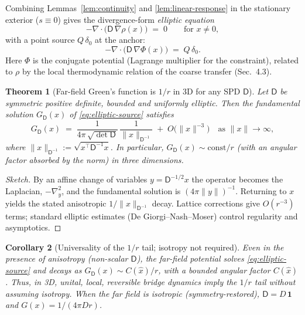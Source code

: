 \documentclass[11pt]{article}
\theoremstyle{plain}
\newtheorem{theorem}{Theorem}[section]
\newtheorem{corollary}[theorem]{Corollary}
\theoremstyle{definition}
\begin{document}
Combining Lemmas~\ref{lem:continuity} and \ref{lem:linear-response} in the stationary exterior ($s\equiv 0$) gives the divergence-form \emph{elliptic equation}
\begin{equation}\label{eq:elliptic}
  -\nabla\!\cdot\!\big(\mathsf{D}\,\nabla \rho(x)\big)\;=\;0 \qquad \text{for } x\!\neq\!0,
\end{equation}
with a point source $Q\,\delta_0$ at the anchor:
\begin{equation}\label{eq:elliptic-source}
  -\nabla\!\cdot\!\big(\mathsf{D}\,\nabla \Phi(x)\big)\;=\;Q\,\delta_0.
\end{equation}
Here $\Phi$ is the conjugate potential (Lagrange multiplier for the constraint), related to $\rho$ by the local thermodynamic relation of the coarse transfer (Sec.~4.3).

\begin{theorem}[Far-field Green’s function is $1/r$ in 3D for any SPD $\mathsf{D}$]
  \label{thm:greens}
  Let $\mathsf{D}$ be symmetric positive definite, bounded and uniformly elliptic. Then the fundamental solution $G_{\mathsf{D}}(x)$ of \eqref{eq:elliptic-source} satisfies
  \[
    G_{\mathsf{D}}(x)
    \;=\;
    \frac{1}{4\pi\,\sqrt{\det \mathsf{D}}}\,\frac{1}{\|x\|_{\mathsf{D}^{-1}}}
    \;+\; O\!\big(\|x\|^{-3}\big)
    \quad\text{as }\|x\|\to\infty,
  \]
  where $\|x\|_{\mathsf{D}^{-1}} := \sqrt{x^\top \mathsf{D}^{-1} x}$. In particular, $G_{\mathsf{D}}(x)\sim \text{const}/r$ (with an angular factor absorbed by the norm) in three dimensions.
\end{theorem}

\begin{proof}[Sketch]
  By an affine change of variables $y=\mathsf{D}^{-1/2}x$ the operator becomes the Laplacian, $-\nabla_y^2$, and the fundamental solution is $(4\pi \|y\|)^{-1}$.
  Returning to $x$ yields the stated anisotropic $1/\|x\|_{\mathsf{D}^{-1}}$ decay.
  Lattice corrections give $O(r^{-3})$ terms; standard elliptic estimates (De Giorgi–Nash–Moser) control regularity and asymptotics.
\end{proof}

\begin{corollary}[Universality of the $1/r$ tail; isotropy not required]
  \label{cor:universal-1overr}
  Even in the presence of anisotropy (non-scalar $\mathsf{D}$), the far-field potential solves \eqref{eq:elliptic-source} and decays as $G_{\mathsf{D}}(x)\sim C(\hat{x})/r$, with a bounded angular factor $C(\hat{x})$. Thus, in 3D, \emph{unital, local, reversible} bridge dynamics imply the $1/r$ tail without assuming isotropy. When the far field is isotropic (symmetry-restored), $\mathsf{D}=D\,\mathbf{1}$ and $G(x)=1/(4\pi D r)$.
\end{corollary}
\end{document}
